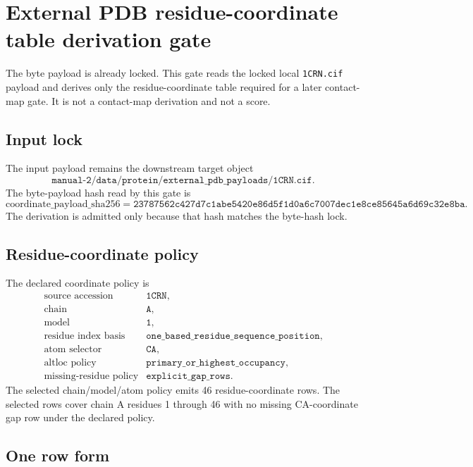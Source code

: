 \section{External PDB residue-coordinate table derivation gate}

The byte payload is already locked. This gate reads the locked local \texttt{1CRN.cif} payload and derives only the residue-coordinate table required for a later contact-map gate. It is not a contact-map derivation and not a score.

\subsection{Input lock}

The input payload remains the downstream target object
\[
  \texttt{manual-2/data/protein/external\_pdb\_payloads/1CRN.cif}.
\]
The byte-payload hash read by this gate is
\[
  \mathrm{coordinate\_payload\_sha256}
  =\texttt{23787562c427d7c1abe5420e86d5f1d0a6c7007dec1e8ce85645a6d69c32e8ba}.
\]
The derivation is admitted only because that hash matches the byte-hash lock.

\subsection{Residue-coordinate policy}

The declared coordinate policy is
\[
\begin{array}{ll}
\text{source accession} & \texttt{1CRN},\\
\text{chain} & \texttt{A},\\
\text{model} & \texttt{1},\\
\text{residue index basis} & \texttt{one\_based\_residue\_sequence\_position},\\
\text{atom selector} & \texttt{CA},\\
\text{altloc policy} & \texttt{primary\_or\_highest\_occupancy},\\
\text{missing-residue policy} & \texttt{explicit\_gap\_rows}.
\end{array}
\]
The selected chain/model/atom policy emits 46 residue-coordinate rows. The selected rows cover chain A residues 1 through 46 with no missing CA-coordinate gap row under the declared policy.

\subsection{One row form}

